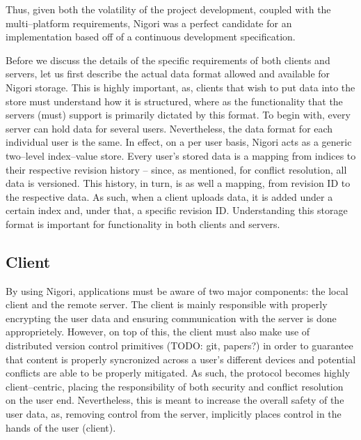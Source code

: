 Thus, given both the volatility of the project development, coupled with the multi--platform requirements, Nigori was a perfect candidate for an implementation based off of a continuous development specification.

Before we discuss the details of the specific requirements of both clients and servers, let us first describe the actual data format allowed and available for Nigori storage.
This is highly important, as, clients that wish to put data into the store must understand how it is structured, where as the functionality that the servers (must) support is primarily dictated by this format.
To begin with, every server can hold data for several users.
Nevertheless, the data format for each individual user is the same.
In effect, on a per user basis, Nigori acts as a generic two--level index--value store.
Every user's stored data is a mapping from indices to their respective revision history -- since, as mentioned, for conflict resolution, all data is versioned.
This history, in turn, is as well a mapping, from revision ID to the respective data.
As such, when a client uploads data, it is added under a certain index and, under that, a specific revision ID.
Understanding this storage format is important for functionality in both clients and servers.

\subsection{Client}
By using Nigori, applications must be aware of two major components: the local client and the remote server.
The client is mainly responsible with properly encrypting the user data and ensuring communication with the server is done approprietely.
However, on top of this, the client must also make use of distributed version control primitives (TODO: git, papers?) in order to guarantee that content is properly syncronized across a user's different devices and potential conflicts are able to be properly mitigated.
As such, the protocol becomes highly client--centric, placing the responsibility of both security and conflict resolution on the user end.
Nevertheless, this is meant to increase the overall safety of the user data, as, removing control from the server, implicitly places control in the hands of the user (client).

